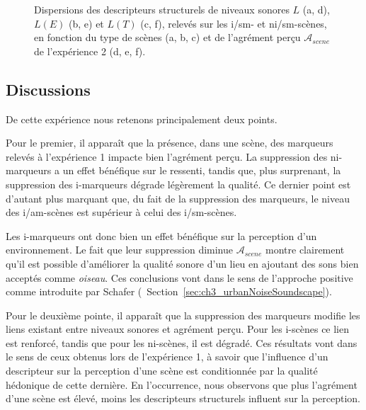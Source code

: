 \begin{figure}[t]
        \caption{Dispersions des descripteurs structurels de niveaux sonores $L$ (a, d), $L(E)$ (b, e) et $L(T)$ (c, f), relevés sur les i/sm- et ni/sm-scènes, en fonction du type de scènes (a, b, c) et de l'agrément perçu $\mathcal{A}_{scene}$ de l'expérience 2 (d, e, f).}\label{fig:soundlevelSansMarker}
\end{figure}

\subsection{Discussions}

De cette expérience nous retenons principalement deux points.

Pour le premier, il apparaît que la présence, dans une scène, des marqueurs relevés à l'expérience 1 impacte bien l'agrément perçu. La suppression des ni-marqueurs a un effet bénéfique sur le ressenti, tandis que, plus surprenant, la suppression des i-marqueurs dégrade légèrement la qualité. Ce dernier point est d'autant plus marquant que, du fait de la suppression des marqueurs, le niveau des i/am-scènes est supérieur à celui des i/sm-scènes.

Les i-marqueurs ont donc bien un effet bénéfique sur la perception d'un environnement. Le fait que leur suppression diminue $\mathcal{A}_{scene}$ montre clairement qu'il est possible d'améliorer la qualité sonore d'un lieu en ajoutant des sons bien acceptés comme \emph{oiseau}. Ces conclusions vont dans le sens de l'approche positive comme introduite par Schafer \citep{schafer1977tuning} (\cf~Section~\ref{sec:ch3_urbanNoiseSoundscape}).

Pour le deuxième pointe, il apparaît que la suppression des marqueurs modifie les liens existant entre niveaux sonores et agrément perçu. Pour les i-scènes ce lien est renforcé, tandis que pour les ni-scènes, il est dégradé. Ces résultats vont dans le sens de ceux obtenus lors de l'expérience 1, à savoir que l'influence d'un descripteur sur la perception d'une scène est conditionnée par la qualité hédonique de cette dernière. En l'occurrence, nous observons que plus l'agrément d'une scène est élevé, moins les descripteurs structurels influent sur la perception.

